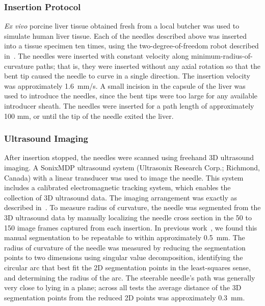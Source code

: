 \subsubsection{Insertion Protocol}
\textit{Ex vivo} porcine liver tissue obtained fresh from a local butcher was used to simulate human liver tissue. Each of the needles described above was inserted into a tissue specimen ten times, using the two-degree-of-freedom robot described in~\cite{Adebar2014}. The needles were inserted with constant velocity along minimum-radius-of-curvature paths; that is, they were inserted without any axial rotation so that the bent tip caused the needle to curve in a single direction. The insertion velocity was approximately 1.6~mm/s. A small incision in the capsule of the liver was used to introduce the needles, since the bent tips were too large for any available introducer sheath. The needles were inserted for a path length of approximately 100 mm, or until the tip of the needle exited the liver. 

\subsubsection{Ultrasound Imaging}
After insertion stopped, the needles were scanned using freehand 3D ultrasound imaging. A SonixMDP ultrasound system (Ultrasonix Research Corp.; Richmond, Canada) with a linear transducer was used to image the needle. This system includes a calibrated electromagnetic tracking system, which enables the collection of 3D ultrasound data. The imaging arrangement was exactly as described in~\cite{Greer2014}. To measure radius of curvature, the needle was segmented from the 3D ultrasound data by manually localizing the needle cross section in the 50 to 150 image frames captured from each insertion. In previous work~\cite{Adebar2014}, we found this manual segmentation to be repeatable to within approximately 0.5~mm. The radius of curvature of the needle was measured by reducing the segmentation points to two dimensions using singular value decomposition, identifying the circular arc that best fit the 2D segmentation points in the least-squares sense, and determining the radius of the arc. The steerable needle's path was generally very close to lying in a plane; across all tests the average distance of the 3D segmentation points from the reduced 2D points was approximately 0.3~mm.

